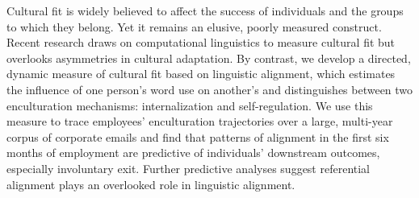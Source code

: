 Cultural fit is widely believed to affect the success of individuals and the groups to which they belong. Yet it remains an elusive, poorly measured construct. Recent research draws on computational linguistics to measure cultural fit but overlooks asymmetries in cultural adaptation. By contrast, we develop a directed, dynamic measure of cultural fit based on linguistic alignment, which estimates the influence of one person's word use on another's and distinguishes between two enculturation mechanisms: internalization and self-regulation. We use this measure to trace employees' enculturation trajectories over a large, multi-year corpus of corporate emails and find that patterns of alignment in the first six months of employment are predictive of individuals' downstream outcomes, especially involuntary exit. Further predictive analyses suggest referential alignment plays an overlooked role in linguistic alignment.
